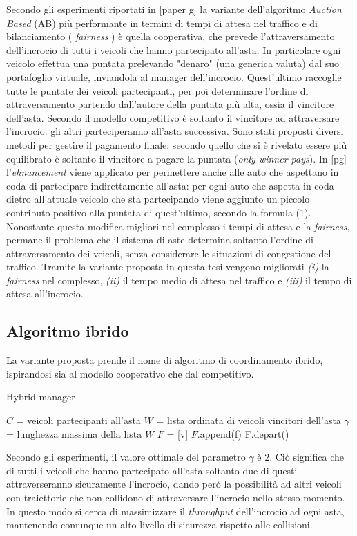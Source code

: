\documentclass[letterpaper, 12pt]{article}
\begin{document}
Secondo gli esperimenti riportati in [paper g] la variante dell'algoritmo
\emph{Auction Based} (AB) più performante in termini di tempi di attesa nel traffico
e di bilanciamento  ( \emph{fairness} ) è quella cooperativa, che prevede l'attraversamento
dell'incrocio di tutti i veicoli che hanno partecipato all'asta. In particolare
ogni veicolo effettua una puntata prelevando "denaro" (una generica valuta) 
dal suo portafoglio virtuale, inviandola al manager dell'incrocio. Quest'ultimo
raccoglie tutte le puntate dei veicoli partecipanti, per poi determinare
l'ordine di attraversamento partendo dall'autore della puntata più alta, ossia il vincitore dell'asta.
Secondo il modello competitivo è soltanto il vincitore ad attraversare
l'incrocio: gli altri parteciperanno all'asta successiva.
Sono stati proposti diversi metodi per gestire il pagamento finale: secondo
quello che si è rivelato essere più equilibrato è soltanto il vincitore a pagare
la puntata (\emph{only winner pays}).
In [pg] l'\emph{ehnancement} viene applicato per permettere anche alle auto
che aspettano in coda di partecipare indirettamente all'asta: per ogni auto
che aspetta in coda dietro all'attuale veicolo che sta partecipando viene aggiunto
un piccolo contributo positivo alla puntata di quest'ultimo, secondo la formula (1).
Nonostante questa modifica migliori nel complesso i tempi di attesa e la \emph{fairness}, 
permane il problema che il sistema di aste determina soltanto l'ordine di attraversamento dei veicoli,
senza considerare le situazioni di congestione del traffico.
Tramite la variante proposta in questa tesi vengono migliorati \emph{(i)} la \emph{fairness} nel complesso,
\emph{(ii)} il tempo medio di attesa nel traffico e \emph{(iii)} il tempo di attesa
all'incrocio.
\subsection{Algoritmo ibrido}
\label{sec:orga78bac9}
La variante proposta prende il nome di algoritmo di coordinamento
ibrido, ispirandosi sia al modello cooperativo che 
dal competitivo.
\begin{algorithm}
\caption{Hybrid manager}\label{alg:cap}
\begin{algorithmic}
\State $C$ = veicoli partecipanti all'asta
\State $W$ = lista ordinata di veicoli vincitori dell'asta
\State $\gamma$ = lunghezza massima della lista $W$
\State $F$ = [v]
        \State $F$.append(f)
      \EndIf
    \EndFor
  \EndFor
\State F.depart()
\EndFor
\end{algorithmic}
\end{algorithm}

Secondo gli esperimenti, il valore ottimale del parametro \(\gamma\)
è \(2\). Ciò significa che di tutti i veicoli che hanno partecipato all'asta
soltanto due di questi attraverseranno sicuramente l'incrocio, dando però
la possibilità ad altri veicoli con traiettorie che non collidono di attraversare
l'incrocio nello stesso momento. In questo modo si cerca di massimizzare il \emph{throughput}
dell'incrocio ad ogni asta, mantenendo comunque un alto livello di sicurezza rispetto
alle collisioni.
\end{document}
